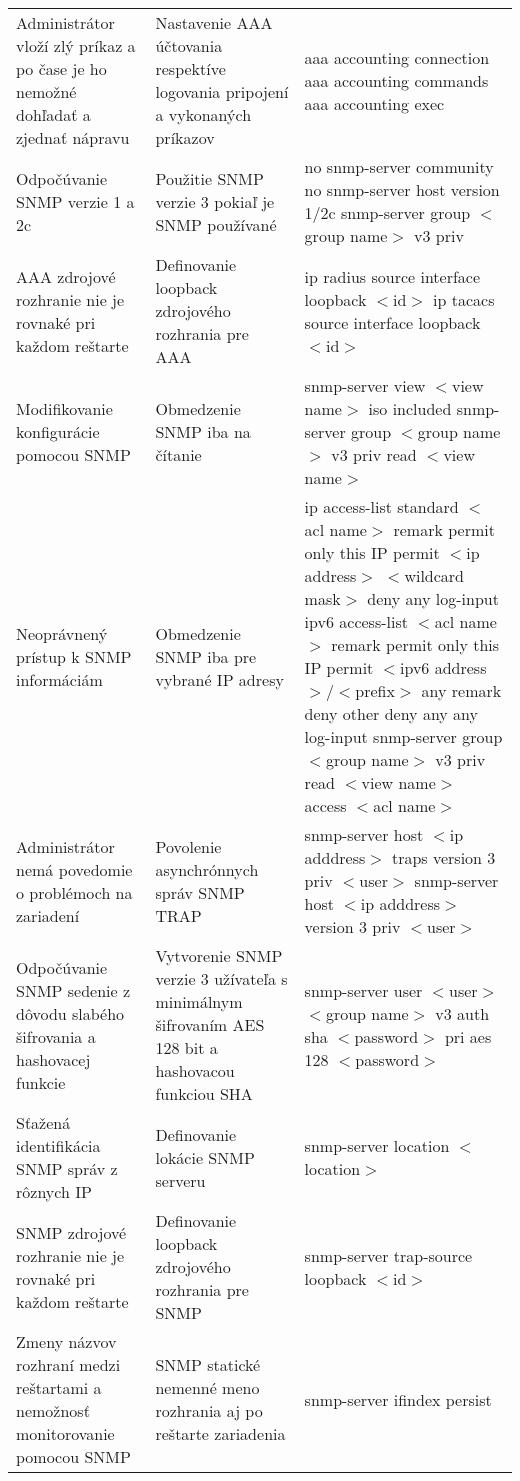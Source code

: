 \begin{longtable}[!htbp]{|L{10em}L{10em}L{34em}|}
	Administrátor vloží zlý príkaz a po čase je ho nemožné dohľadať a zjednať nápravu	&Nastavenie AAA účtovania respektíve logovania pripojení a vykonaných príkazov	&aaa accounting connection
	aaa accounting commands
	aaa accounting exec
	\\
	Odpočúvanie SNMP verzie 1 a 2c	&Použitie SNMP verzie 3 pokiaľ je SNMP používané	&no snmp-server community
	no snmp-server host  version 1/2c
	snmp-server group $<$group name$>$ v3 priv \\
	AAA zdrojové rozhranie nie je rovnaké pri každom reštarte	&Definovanie loopback zdrojového rozhrania pre AAA	&ip radius source interface loopback $<$id$>$
	ip tacacs source interface loopback $<$id$>$\\
	Modifikovanie konfigurácie pomocou SNMP	&Obmedzenie SNMP iba na čítanie	&snmp-server view $<$view name$>$ iso included
	snmp-server group $<$group name$>$ v3 priv read $<$view name$>$\\
	Neoprávnený prístup k SNMP informáciám	&Obmedzenie SNMP iba pre vybrané IP adresy	&ip access-list standard $<$acl name$>$
	remark permit only this IP 
	permit $<$ip address$>$ $<$wildcard mask$>$
	deny any log-input
	ipv6 access-list $<$acl name$>$
	remark permit only this IP 
	permit $<$ipv6 address$>$/$<$prefix$>$ any
	remark deny other
	deny any any log-input
	snmp-server group $<$group name$>$ v3 priv read $<$view name$>$  access $<$acl name$>$\\
	Administrátor nemá povedomie o problémoch na zariadení	&Povolenie asynchrónnych správ SNMP TRAP	&snmp-server host $<$ip adddress$>$ traps version 3 priv $<$user$>$
	snmp-server host $<$ip adddress$>$ version 3 priv $<$user$>$\\
	Odpočúvanie SNMP sedenie z dôvodu slabého šifrovania a hashovacej  funkcie	&Vytvorenie SNMP verzie 3 užívateľa s minimálnym šifrovaním AES 128 bit a hashovacou funkciou SHA	&snmp-server user $<$user$>$ $<$group name$>$ v3 auth sha $<$password$>$ pri aes 128 $<$password$>$\\
	Sťažená identifikácia SNMP správ z rôznych IP	&Definovanie lokácie SNMP serveru	&snmp-server location $<$location$>$\\
	SNMP zdrojové rozhranie nie je rovnaké pri každom reštarte	& Definovanie loopback zdrojového rozhrania pre SNMP	&snmp-server trap-source loopback $<$id$>$\\
	Zmeny názvov rozhraní medzi reštartami a nemožnosť monitorovanie pomocou SNMP	&SNMP statické nemenné meno rozhrania aj po reštarte zariadenia	&snmp-server ifindex persist\\

\end{longtable}

